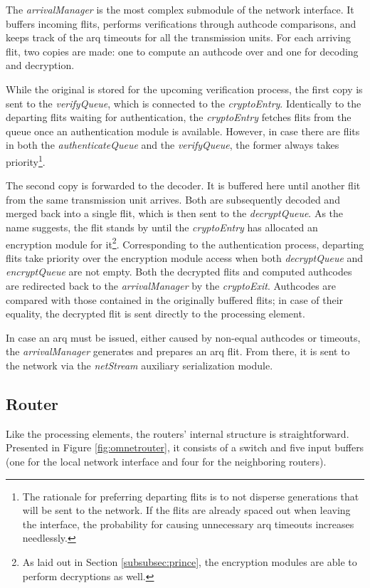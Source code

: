 The \textit{arrivalManager} is the most complex submodule of the network interface. It buffers incoming flits, performs verifications through authcode
comparisons, and keeps track of the \gls{arq} timeouts for all the transmission units. For each arriving flit, two copies are made: one to compute an
authcode over and one for decoding and decryption.

While the original is stored for the upcoming verification process, the first copy is sent to the
\textit{verifyQueue}, which is connected to the \textit{cryptoEntry}. Identically to the departing flits waiting for authentication, the
\textit{cryptoEntry} fetches flits from the queue once an authentication module is available. However, in case there are flits in both the
\textit{authenticateQueue} and the \textit{verifyQueue}, the former always takes priority\footnote{The rationale for preferring departing flits is to
not disperse generations that will be sent to the network. If the flits are already spaced out when leaving the interface, the probability for causing
unnecessary \gls{arq} timeouts increases needlessly.}.

The second copy is forwarded to the decoder. It is buffered here until another flit from the
same transmission unit arrives. Both are subsequently decoded and merged back into a single flit, which is then sent to the \textit{decryptQueue}. As
the name suggests, the flit stands by until the \textit{cryptoEntry} has allocated an encryption module for it\footnote{As laid out in Section
\ref{subsubsec:prince}, the encryption modules are able to perform decryptions as well.}. Corresponding to the authentication process, departing flits
take priority over the encryption module access when both \textit{decryptQueue} and \textit{encryptQueue} are not empty. Both the decrypted flits and
computed authcodes are redirected back to the \textit{arrivalManager} by the \textit{cryptoExit}. Authcodes are compared with those contained in the
originally buffered flits; in case of their equality, the decrypted flit is sent directly to the processing element.

In case an \gls{arq} must be issued, either caused by non-equal authcodes or timeouts, the \textit{arrivalManager} generates and prepares an
\gls{arq} flit. From there, it is sent to the network via the \textit{netStream} auxiliary serialization module.

\subsection{Router}\label{subsec:routerimpl}
Like the processing elements, the routers' internal structure is straightforward. Presented in Figure \vref{fig:omnetrouter}, it consists of a switch
and five input buffers (one for the local network interface and four for the neighboring routers).

